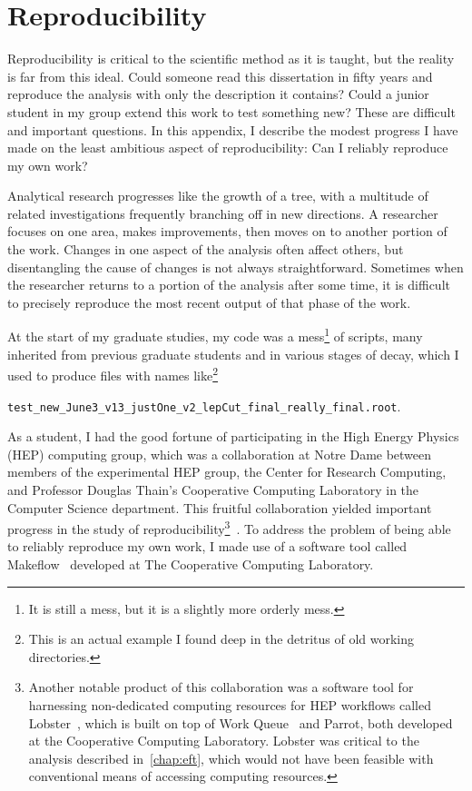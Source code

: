 \chapter{Reproducibility}
Reproducibility is critical to the scientific method as it is taught, but the
reality is far from this ideal. Could someone read this dissertation in fifty
years and reproduce the analysis with only the description it contains? Could a
junior student in my group extend this work to test something new? These are
difficult and important questions. In this appendix, I describe the modest
progress I have made on the least ambitious aspect of reproducibility: Can I
reliably reproduce my own work?

Analytical research progresses like the growth of a tree, with a multitude of
related investigations frequently branching off in new directions. A researcher
focuses on one area, makes improvements, then moves on to another portion of the
work. Changes in one aspect of the analysis often affect others, but
disentangling the cause of changes is not always straightforward. Sometimes when
the researcher returns to a portion of the analysis after some time, it is
difficult to precisely reproduce the most recent output of that phase of the
work.

At the start of my graduate studies, my code was a mess\footnote{It is still a
mess, but it is a slightly more orderly mess.} of scripts, many inherited from
previous graduate students and in various stages of decay, which I used to
produce files with names like\footnote{This is an actual example I found deep in
the detritus of old working directories.}

\mbox{\texttt{test\_new\_June3\_v13\_justOne\_v2\_lepCut\_final\_really\_final.root}}.

As a student, I had the good fortune of participating in the High Energy Physics
(HEP) computing group, which was a collaboration at Notre Dame between members
of the experimental HEP group, the Center for Research Computing, and Professor
Douglas Thain's Cooperative Computing Laboratory in the Computer Science
department. This fruitful collaboration yielded important progress in the study
of reproducibility\footnote{Another notable product of this collaboration was a
software tool for harnessing non-dedicated computing resources for HEP workflows
called Lobster~\cite{oppo-ccgrid14, 1742-6596-664-3-032035,
1742-6596-664-6-062038, WoodardWMVTDIAB15, CHEP2016ND, CHEP2016Lobster}, which
is built on top of Work Queue~\cite{wq} and Parrot, both developed at the
Cooperative Computing Laboratory. Lobster was critical to the analysis described
in~\cref{chap:eft}, which would not have been feasible with conventional means
of accessing computing
resources.}~\cite{MengTVWW16,1742-6596-664-3-032022,umbrella}. To address the
problem of being able to reliably reproduce my own work, I made use of a
software tool called Makeflow~\cite{Albrecht} developed at The Cooperative
Computing Laboratory.

